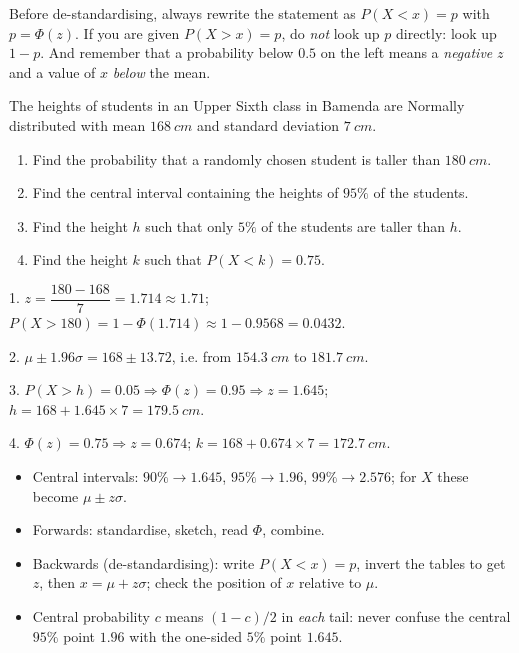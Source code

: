\documentclass[11pt]{article}
\begin{document}
\begin{attention}
Before de-standardising, always rewrite the statement as $P(X<x)=p$ with $p=\Phi(z)$. If you are given $P(X>x)=p$, do \emph{not} look up $p$ directly: look up $1-p$. And remember that a probability below $0.5$ on the left means a \emph{negative} $z$ and a value of $x$ \emph{below} the mean.
\end{attention}

\begin{exercice}[Consolidation]
The heights of students in an Upper Sixth class in Bamenda are Normally distributed with mean $\SI{168}{cm}$ and standard deviation $\SI{7}{cm}$.
\begin{enumerate}
\item Find the probability that a randomly chosen student is taller than $\SI{180}{cm}$.
\item Find the central interval containing the heights of $95\%$ of the students.
\item Find the height $h$ such that only $5\%$ of the students are taller than $h$.
\item Find the height $k$ such that $P(X<k)=0.75$.
\end{enumerate}
\end{exercice}

\begin{corrige}[Exercise 1]
1. $z=\dfrac{180-168}{7}=1.714\approx 1.71$; $P(X>180)=1-\Phi(1.714)\approx 1-0.9568=0.0432$.

2. $\mu\pm 1.96\sigma=168\pm 13.72$, i.e. from $\SI{154.3}{cm}$ to $\SI{181.7}{cm}$.

3. $P(X>h)=0.05\Rightarrow\Phi(z)=0.95\Rightarrow z=1.645$; $h=168+1.645\times 7=\SI{179.5}{cm}$.

4. $\Phi(z)=0.75\Rightarrow z=0.674$; $k=168+0.674\times 7=\SI{172.7}{cm}$.
\end{corrige}

\begin{aretenir}
\begin{itemize}
\item Central intervals: $90\%\to 1.645$, $95\%\to 1.96$, $99\%\to 2.576$; for $X$ these become $\mu\pm z\sigma$.
\item Forwards: standardise, sketch, read $\Phi$, combine.
\item Backwards (de-standardising): write $P(X<x)=p$, invert the tables to get $z$, then $x=\mu+z\sigma$; check the position of $x$ relative to $\mu$.
\item Central probability $c$ means $(1-c)/2$ in \emph{each} tail: never confuse the central $95\%$ point $1.96$ with the one-sided $5\%$ point $1.645$.
\end{itemize}
\end{aretenir}
\end{document}
